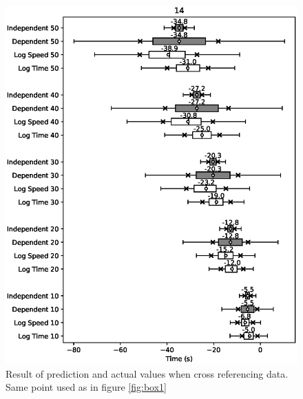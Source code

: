 \documentclass{article}
\begin{document}
				\begin{figure}[H]
					\includegraphics[scale=0.7]{14.eps}
					\caption{Result of prediction and actual values when cross referencing data. Same point used as in figure \ref{fig:box1}}
					\label{fig:cross1}
				\end{figure}
\end{document}
